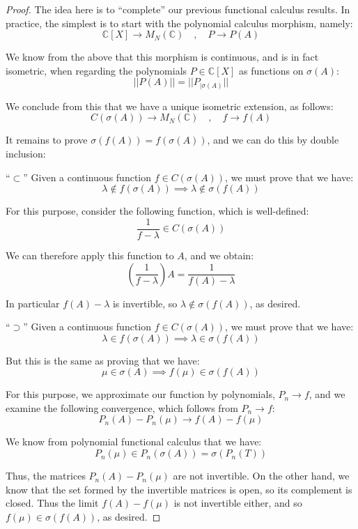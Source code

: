 \documentclass[12pt]{amsbook}
\begin{document}
\begin{proof}
The idea here is to ``complete'' our previous functional calculus results. In practice, the simplest is to start with the polynomial calculus morphism, namely:
$$\mathbb C[X]\to M_N(\mathbb C)\quad,\quad 
P\to P(A)$$

We know from the above that this morphism is continuous, and is in fact isometric, when regarding the polynomials $P\in\mathbb C[X]$ as functions on $\sigma(A)$:
$$||P(A)||=||P_{|\sigma(A)}||$$

We conclude from this that we have a unique isometric extension, as follows:
$$C(\sigma(A))\to M_N(\mathbb C)\quad,\quad  
f\to f(A)$$

It remains to prove $\sigma(f(A))=f(\sigma(A))$, and we can do this by double inclusion:

\medskip

``$\subset$'' Given a continuous function $f\in C(\sigma(A))$, we must prove that we have:
$$\lambda\notin f(\sigma(A))\implies\lambda\notin\sigma(f(A))$$

For this purpose, consider the following function, which is well-defined:
$$\frac{1}{f-\lambda}\in C(\sigma(A))$$

We can therefore apply this function to $A$, and we obtain:
$$\left(\frac{1}{f-\lambda}\right)A=\frac{1}{f(A)-\lambda}$$

In particular $f(A)-\lambda$ is invertible, so  $\lambda\notin\sigma(f(A))$, as desired.

\medskip

``$\supset$'' Given a continuous function $f\in C(\sigma(A))$, we must prove that we have: 
$$\lambda\in f(\sigma(A))\implies\lambda\in\sigma(f(A))$$

But this is the same as proving that we have:
$$\mu\in\sigma(A)\implies f(\mu)\in\sigma(f(A))$$

For this purpose, we approximate our function by polynomials, $P_n\to f$, and we examine the following convergence, which follows from $P_n\to f$:
$$P_n(A)-P_n(\mu)\to f(A)-f(\mu)$$

We know from polynomial functional calculus that we have:
$$P_n(\mu)
\in P_n(\sigma(A))
=\sigma(P_n(T))$$

Thus, the matrices $P_n(A)-P_n(\mu)$ are not invertible. On the other hand, we know that the set formed by the invertible matrices is open, so its complement is closed. Thus the limit $f(A)-f(\mu)$ is not invertible either, and so $f(\mu)\in\sigma(f(A))$, as desired.
\end{proof}
\end{document}
